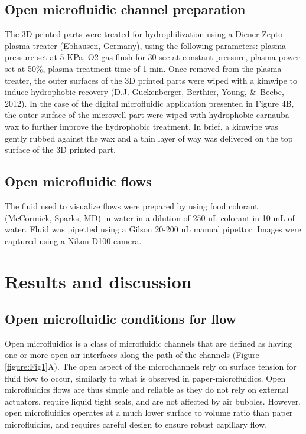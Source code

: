\subsection{Open microfluidic channel preparation}
The 3D printed parts were treated for hydrophilization using a Diener Zepto plasma treater (Ebhausen, Germany), using the following parameters: plasma pressure set at 5 KPa, O2 gas flush for 30 sec at constant pressure, plasma power set at 50\%, plasma treatment time of 1 min. Once removed from the plasma treater, the outer surfaces of the 3D printed parts were wiped with a kimwipe to induce hydrophobic recovery (D.J. Guckenberger, Berthier, Young, \&\, Beebe, 2012). In the case of the digital microfluidic application presented in Figure 4B, the outer surface of the microwell part were wiped with hydrophobic carnauba wax to further improve the hydrophobic treatment. In brief, a kimwipe was gently rubbed against the wax and a thin layer of way was delivered on the top surface of the 3D printed part. 

\subsection{Open microfluidic flows}
The fluid used to visualize flows were prepared by using food colorant (McCormick, Sparks, MD) in water in a dilution of 250 uL colorant in 10 mL of water. Fluid was pipetted using a Gilson 20-200 uL manual pipettor. Images were captured using a Nikon D100 camera.

\section{Results and discussion}

\subsection{Open microfluidic conditions for flow}
Open microfluidics is a class of microfluidic channels that are defined as having one or more open-air interfaces along the path of the channels (Figure \ref{figure:Fig1}A). The open aspect of the microchannels rely on surface tension for fluid flow to occur, similarly to what is observed in paper-microfluidics. Open microfluidics flows are thus simple and reliable as they do not rely on external actuators, require liquid tight seals, and are not affected by air bubbles. However, open microfluidics operates at a much lower surface to volume ratio than paper microfluidics, and requires careful design to ensure robust capillary flow. 

